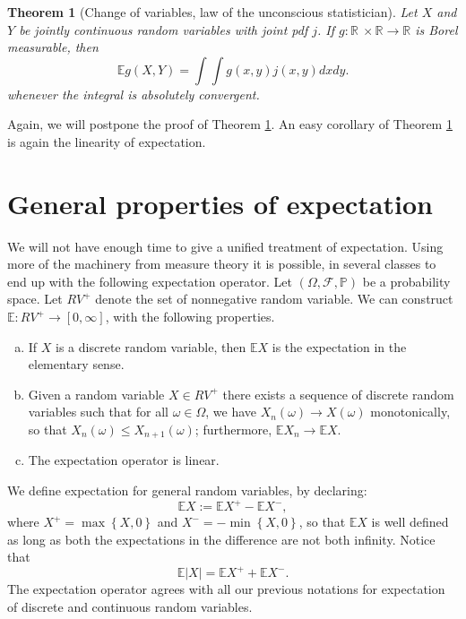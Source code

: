 \documentclass[12pt, reqno]{amsart}
\newtheorem{theorem}{Theorem}
\newcommand\ns[1]{ \left\{ {#1} \right\} }
\renewcommand{\P}{{\mathbb P}}  %
\newcommand{\R}{{\mathbb R}}
\newcommand{\E}{{\mathbb E}}     %
\newcommand{\F}{{\mathcal F}}     %
\begin{document}
\begin{theorem}[Change of variables, law of the unconscious statistician]
\label{CVv}
Let $X$  and $Y$ be jointly continuous random variables  with joint pdf $j$.     If $g: \R\ \times \R \to \R$ is Borel measurable,  then 
	$$ \E g(X,Y) = \int\int g(x,y)j(x,y) dxdy.$$
	whenever the integral  is absolutely convergent.  
\end{theorem}



Again, we will postpone the proof of Theorem \ref{CVv}.    An easy corollary of Theorem \ref{CVv} is again the linearity of expectation.  

\section{General properties of expectation}

We will not have enough time to give a unified treatment of expectation. Using more of the machinery from measure theory it is possible, in several classes to end up with the following expectation operator.  Let $(\Omega, \F, \P)$ be a probability space.  Let $RV^{+}$ denote the set of nonnegative random variable.   We can construct $\E : RV^{+} \to [0, \infty]$, with the following properties.
\begin{enumerate}[(a)]
\item
If $X$ is a discrete random variable, then $\E X$ is the expectation in the elementary sense.
\item
Given a random variable $X \in RV^{+}$ there exists a sequence of discrete random variables such that for all $\omega \in \Omega$, we have  $X_n(\omega) \to  X(\omega)$ monotonically, so that $X_n(\omega) \leq X_{n+1}(\omega)$; furthermore, $\E X_n \to \E X$.
\item
The expectation operator is linear.
\end{enumerate}
We define expectation for  general random variables, by declaring:
$$ \E X := \E X^{+} - \E X^{-},$$
where $X^{+} = \max\ns{X, 0}$
and $ X^{-} = -\min\ns{X, 0}$, so that $\E X$ is well defined as long as both the expectations in the difference are not both infinity.     Notice that 
$$\E |X| =  \E X^{+} + \E X^{-}.$$
The expectation operator agrees with all our previous notations for expectation of discrete and continuous random variables.    
\end{document}
